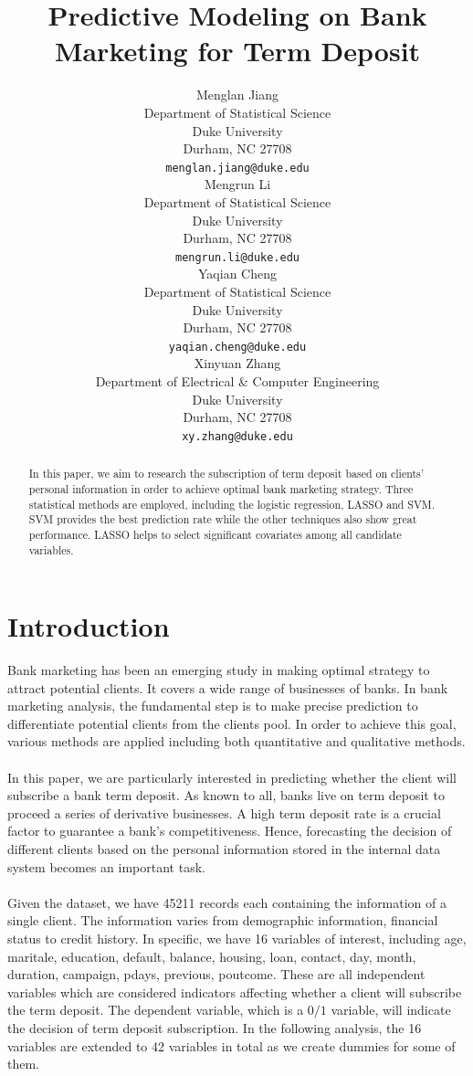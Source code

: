 \documentclass{article} %
\title{Predictive Modeling on Bank Marketing for Term Deposit}
\author{
  Menglan Jiang \\
  Department of Statistical Science\\
  Duke University\\
  Durham, NC 27708 \\
  \texttt{menglan.jiang@duke.edu} \\
  \And
  Mengrun Li \\
  Department of Statistical Science\\
  Duke University\\
  Durham, NC 27708 \\
  \texttt{mengrun.li@duke.edu} \\
  \AND
  Yaqian Cheng \\
  Department of Statistical Science\\
  Duke University\\
  Durham, NC 27708 \\
  \texttt{yaqian.cheng@duke.edu} \\
  \And
  Xinyuan Zhang \\
  Department of Electrical \& Computer Engineering\\
  Duke University\\
  Durham, NC 27708 \\
  \texttt{xy.zhang@duke.edu} \\
}
\begin{document}
\maketitle

\begin{abstract}
In this paper, we aim to research the subscription of term deposit based on clients' personal information in order to achieve optimal bank marketing strategy. Three statistical methods are employed, including the logistic regression, LASSO and SVM. SVM provides the best prediction rate while the other techniques also show great performance. LASSO helps to select significant covariates among all candidate variables.
\end{abstract}

\section{Introduction}
\label{introduction}
Bank marketing has been an emerging study in making optimal strategy to attract potential clients. It covers a wide range of businesses of banks. In bank marketing analysis, the fundamental step is to make precise prediction to differentiate potential clients from the clients pool. In order to achieve this goal, various methods are applied including both quantitative and qualitative methods. \\\\
In this paper, we are particularly interested in predicting whether the client will subscribe a bank term deposit. As known to all, banks live on term deposit to proceed a series of derivative businesses. A high term deposit rate is a crucial factor to guarantee a bank's competitiveness. Hence, forecasting the decision of different clients based on the personal information stored in the internal data system becomes an important task. \\\\
Given the dataset, we have 45211 records each containing the information of a single client. The information varies from demographic information, financial status to credit history. In specific, we have 16 variables of interest, including age, maritale, education, default, balance, housing, loan, contact, day, month, duration, campaign, pdays, previous, poutcome. These are all independent variables which are considered indicators affecting whether a client will subscribe the term deposit. The dependent variable, which is a $0/1$ variable, will indicate the decision of term deposit subscription. In the following analysis, the 16 variables are extended to 42 variables in total as we create dummies for some of them.\\\\
\end{document}
